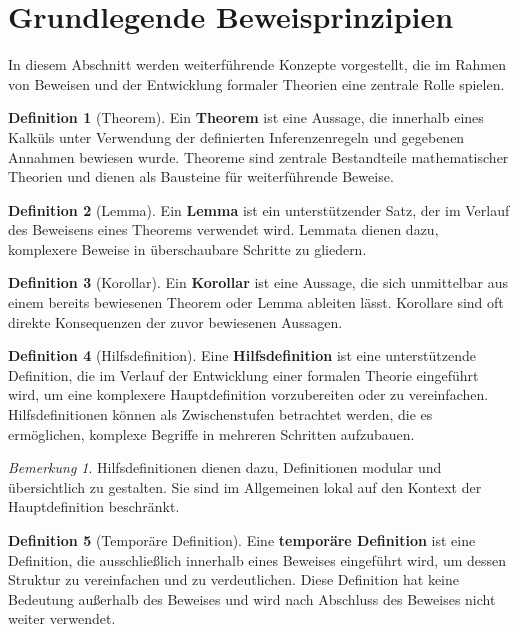 \documentclass{book}
\theoremstyle{plain}
\theoremstyle{remark}
\newtheorem*{remark}{Bemerkung}
\theoremstyle{definition}
\newtheorem{definition}{Definition}[section]
\begin{document}
\section{Grundlegende Beweisprinzipien}

In diesem Abschnitt werden weiterführende Konzepte vorgestellt, die im Rahmen von Beweisen und der Entwicklung formaler Theorien eine zentrale Rolle spielen.


\begin{definition}[Theorem]
Ein \textbf{Theorem} ist eine Aussage, die innerhalb eines Kalküls unter Verwendung der definierten Inferenzenregeln und gegebenen Annahmen bewiesen wurde. Theoreme sind zentrale Bestandteile mathematischer Theorien und dienen als Bausteine für weiterführende Beweise.
\end{definition}

\begin{definition}[Lemma]
Ein \textbf{Lemma} ist ein unterstützender Satz, der im Verlauf des Beweisens eines Theorems verwendet wird. Lemmata dienen dazu, komplexere Beweise in überschaubare Schritte zu gliedern.
\end{definition}

\begin{definition}[Korollar]
Ein \textbf{Korollar} ist eine Aussage, die sich unmittelbar aus einem bereits bewiesenen Theorem oder Lemma ableiten lässt. Korollare sind oft direkte Konsequenzen der zuvor bewiesenen Aussagen.
\end{definition}

\begin{definition}[Hilfsdefinition]
Eine \textbf{Hilfsdefinition} ist eine unterstützende Definition, die im Verlauf der Entwicklung einer formalen Theorie eingeführt wird, um eine komplexere Hauptdefinition vorzubereiten oder zu vereinfachen. Hilfsdefinitionen können als Zwischenstufen betrachtet werden, die es ermöglichen, komplexe Begriffe in mehreren Schritten aufzubauen.
\end{definition}

\begin{remark}
Hilfsdefinitionen dienen dazu, Definitionen modular und übersichtlich zu gestalten. Sie sind im Allgemeinen lokal auf den Kontext der Hauptdefinition beschränkt.
\end{remark}

\begin{definition}[Temporäre Definition]
Eine \textbf{temporäre Definition} ist eine Definition, die ausschließlich innerhalb eines Beweises eingeführt wird, um dessen Struktur zu vereinfachen und zu verdeutlichen. Diese Definition hat keine Bedeutung außerhalb des Beweises und wird nach Abschluss des Beweises nicht weiter verwendet.
\end{definition}
\end{document}
